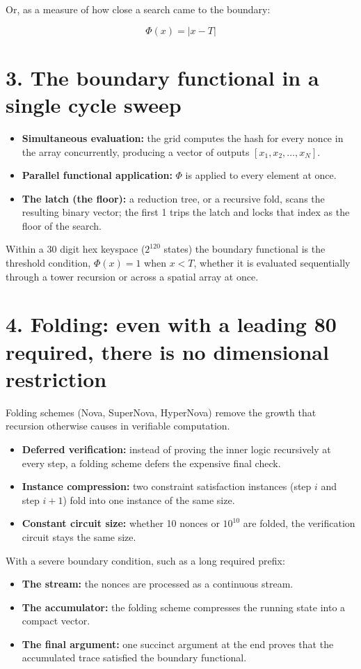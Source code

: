 Or, as a measure of how close a search came to the boundary:

\[
\Phi(x) = |x - T|
\]

\section{\texorpdfstring{3. The boundary functional in a single cycle sweep}{3. The boundary functional in a single cycle sweep}}

\begin{itemize}
\item \textbf{Simultaneous evaluation:} the grid computes the hash for every nonce in the array concurrently, producing a vector of outputs \([x_1, x_2, \ldots, x_N]\).
\item \textbf{Parallel functional application:} \(\Phi\) is applied to every element at once.
\item \textbf{The latch (the floor):} a reduction tree, or a recursive fold, scans the resulting binary vector; the first 1 trips the latch and locks that index as the floor of the search.
\end{itemize}

Within a 30 digit hex keyspace (\(2^{120}\) states) the boundary functional is the threshold condition, \(\Phi(x) = 1\) when \(x < T\), whether it is evaluated sequentially through a tower recursion or across a spatial array at once.

\section{\texorpdfstring{4. Folding: even with a leading 80 required, there is no dimensional restriction}{4. Folding: even with a leading 80 required, there is no dimensional restriction}}

Folding schemes (Nova, SuperNova, HyperNova) remove the growth that recursion otherwise causes in verifiable computation.

\begin{itemize}
\item \textbf{Deferred verification:} instead of proving the inner logic recursively at every step, a folding scheme defers the expensive final check.
\item \textbf{Instance compression:} two constraint satisfaction instances (step \(i\) and step \(i+1\)) fold into one instance of the same size.
\item \textbf{Constant circuit size:} whether 10 nonces or \(10^{10}\) are folded, the verification circuit stays the same size.
\end{itemize}

With a severe boundary condition, such as a long required prefix:

\begin{itemize}
\item \textbf{The stream:} the nonces are processed as a continuous stream.
\item \textbf{The accumulator:} the folding scheme compresses the running state into a compact vector.
\item \textbf{The final argument:} one succinct argument at the end proves that the accumulated trace satisfied the boundary functional.
\end{itemize}
